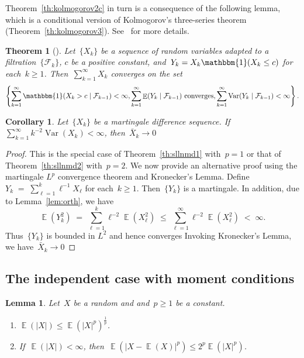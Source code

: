 \documentclass[12pt,a4paper]{article}  %
\newcounter{cite}
\newtheorem{theorem}{Theorem}[section]
\newtheorem{corollary}{Corollary}[section]
\newtheorem{lemma}{Lemma}[section]
\theoremstyle{definition}
\numberwithin{equation}{section}
\newcommand{\ind}{\mathbbm{1}}
\newcommand{\FF}{\mathcal{F}}
\newcommand{\as}{{\text{a.s.}}\xspace}
\DeclareMathOperator{\var}{Var}
\DeclareMathOperator{\expc}{\mathbb{E}}
\begin{document}
Theorem~\ref{th:kolmogorov2c} in turn is a consequence of the following lemma, which is a conditional
version of Kolmogorov's three-series theorem (Theorem~\ref{th:kolmogorov3}). See~\cite[pages~33--36]{Hall_Heyde_1980}
for more details.

\begin{theorem}[\mbox{\cite[Theorem~2.16]{Hall_Heyde_1980}}]
    \label{th:kolmogorov3c}
    Let~$\{X_k\}$ be a sequence of random variables adapted to a filtration~$\{\FF_k\}$, $c$ be a
    positive constant, and~$Y_k = X_k\ind(X_k \le c)$ for each~$k\ge 1$. Then~$\sum_{k=1}^\infty X_k$
    converges \as on the set
    \[
        \left\{
            \sum_{k=1}^\infty \ind(X_k > c \mathrel{|} \FF_{k-1}) < \infty,
            \sum_{k=1}^\infty \expc(Y_k \mathrel{|} \FF_{k-1})~\text{converges},
            \sum_{k=1}^\infty \var(Y_k \mathrel{|} \FF_{k-1}) < \infty
        \right\}.
    \]
\end{theorem}

\begin{corollary}
    \label{coro:mdl2}
    Let~$\{X_k\}$ be a martingale difference sequence. If~$\sum_{k=1}^\infty k^{-2}\var(X_k) < \infty$,
    then~$\bar{X}_k \to 0$ \as
\end{corollary}

\begin{proof}
    This is the special case of Theorem~\ref{th:sllnmd1} with~$p=1$
    or that of Theorem~\ref{th:sllnmd2} with~$p=2$.
    We now provide an alternative proof using the martingale $L^p$ convergence theorem and
    Kronecker's Lemma.
    Define~$Y_k \;=\;  \sum_{\ell=1}^k \ell^{-1}X_\ell$ for each~$k\ge 1$. Then~$\{Y_k\}$ is
    a martingale. In addition, due to Lemma~\ref{lem:orth}, we have
    \[
        \expc(Y_k^2) \;=\; \sum_{\ell=1}^k \ell^{-2}\expc(X_\ell^2) \;\le\; \sum_{\ell=1}^\infty \ell^{-2}
        \expc(X_\ell^2) \;<\; \infty.
    \]
    Thus~$\{Y_k\}$ is bounded in $L^2$ and hence converges \as
    Invoking Kronecker's Lemma, we have~$\bar{X}_k \to 0$ \as
\end{proof}


\subsection{The independent case with moment conditions}
\label{sec:sllnindep}

\begin{lemma}
    \label{lem:expc}
    Let~$X$ be a random and and~$p \ge 1$ be a constant.
    \begin{enumerate}
        \item $\expc(|X|) \le \expc(|X|^p)^{\frac{1}{p}}$.
        \item If~$\expc(|X|) < \infty$, then~$\expc(|X - \expc(X)|^p)\le 2^p \expc(|X|^p)$.
    \end{enumerate}
\end{lemma}
\end{document}
